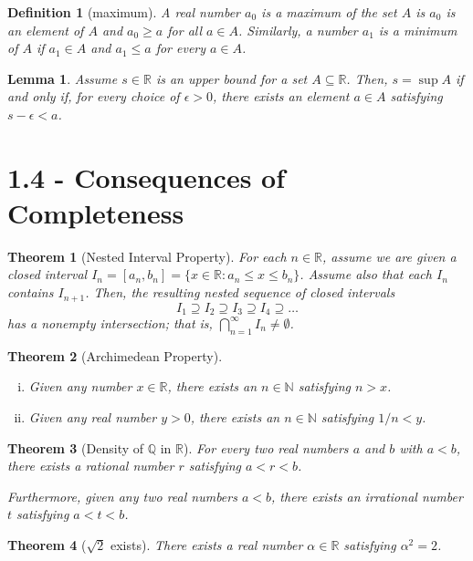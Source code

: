 \documentclass{article}
\newtheorem{definition}{Definition}
\newtheorem{theorem}{Theorem}
\newtheorem{lemma}{Lemma}
\begin{document}
\begin{definition}[maximum]
    A real number $a_0$ is a \textit{maximum} of the set $A$ is $a_0$ is an element of $A$ and $a_0\geq a$ for all $a \in A$. Similarly, a number $a_1$ is a \textit{minimum} of $A$ if $a_1\in A$ and $a_1 \leq a$ for every $a \in A$.
\end{definition}

\begin{lemma}
    Assume $s \in \mathbb{R}$ is an upper bound for a set $A \subseteq \mathbb{R}$. Then, $s = \sup A$ if and only if, for every choice of $\epsilon > 0$, there exists an element $a \in A$ satisfying $s-\epsilon < a$.
\end{lemma}

\section*{1.4 - Consequences of Completeness}
\begin{theorem}[Nested Interval Property]
    For each $n \in \mathbb{R}$, assume we are given a closed interval $I_n=[a_n,b_n]=\{x \in \mathbb{R}:a_n \leq x \leq b_n\}$. Assume also that each $I_n$ contains $I_{n+1}$. Then, the resulting nested sequence of closed intervals \[I_1\supseteq I_2 \supseteq I_3 \supseteq I_4 \supseteq \dots\] has a nonempty intersection; that is, $\bigcap _{n=1}^\infty I_n \neq \emptyset$.
\end{theorem}

\begin{theorem}[Archimedean Property]
    \begin{enumerate}[(i)]
        \item Given any number $x \in \mathbb{R}$, there exists an $n \in \mathbb{N}$ satisfying $n > x$.
        \item Given any real number $y > 0$, there exists an $n \in \mathbb{N}$ satisfying $1/n<y$.
    \end{enumerate}
\end{theorem}

\begin{theorem}[Density of $\mathbb{Q}$ in $\mathbb{R}$]
    For every two real numbers $a$ and $b$ with $a < b$, there exists a rational number $r$ satisfying $a < r < b$.

    Furthermore, given any two real numbers $a < b$, there exists an irrational number $t$ satisfying $a < t < b$.
\end{theorem}

\begin{theorem}[$\sqrt{2}$ exists]
    There exists a real number $\alpha \in \mathbb{R}$ satisfying $\alpha ^2 = 2$.
\end{theorem}
\end{document}
